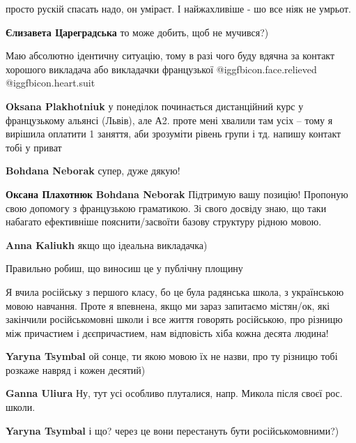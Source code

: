 \begin{itemize}

просто рускій спасать надо, он уміраєт. І найжахливіше - шо все ніяк не умрьот.

\begin{itemize} %
\textbf{Єлизавета Цареградська} то може добить, щоб не мучився?)
\end{itemize} %


Маю абсолютно ідентичну ситуацію, тому в разі чого буду вдячна за контакт
хорошого викладача або викладачки французької  @igg{fbicon.face.relieved} @igg{fbicon.heart.suit}

\begin{itemize} %
\textbf{Oksana Plakhotniuk} у понеділок починається дистанційний курс у французькому альянсі (Львів), але А2. проте мені хвалили там усіх – тому я вирішила оплатити 1 заняття, аби зрозуміти рівень групи і тд. напишу контакт тобі у приват

\textbf{Bohdana Neborak} супер, дуже дякую!

\textbf{Оксана Плахотнюк} \textbf{Bohdana Neborak} Підтримую вашу позицію! Пропоную свою допомогу з французькою граматикою. Зі свого досвіду знаю, що таки набагато ефективніше пояснити/засвоїти базову структуру рідною мовою.

\textbf{Anna Kaliukh} якщо що ідеальна викладачка)

\end{itemize} %

Правильно робиш, що виносиш це у публічну площину


Я вчила російську з першого класу, бо це була радянська школа, з українською
мовою навчання. Проте я впевнена, якщо ми зараз запитаємо містян/ок, які
закінчили російськомовні школи і все життя говорять російською, про різницю між
причастием і дєєпричастием, нам відповість хіба кожна десята людина!

\begin{itemize} %
\textbf{Yaryna Tsymbal} ой сонце, ти якою мовою їх не назви, про ту різницю тобі розкаже навряд і кожен десятий)

\textbf{Ganna Uliura} Ну, тут усі особливо плуталися, напр. Микола після своєї рос. школи.

\textbf{Yaryna Tsymbal} і що? через це вони перестануть бути російськомовними?)


\end{itemize}
\end{itemize}
